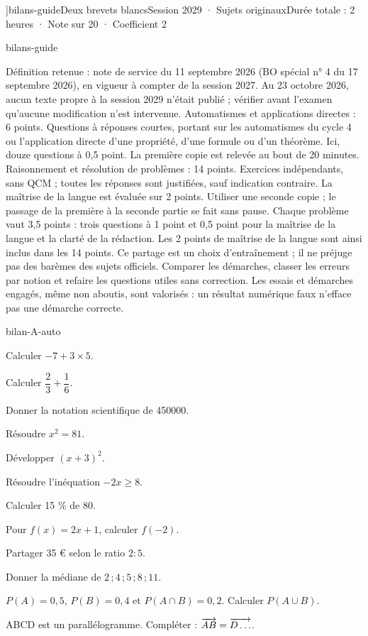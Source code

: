 \editionPage[\pdfbookmark[0]{Deux brevets blancs}{bm-bilans-guide-parent}]{bilans-guide}{Deux brevets blancs}{Session 2029 · Sujets originaux}{Durée totale : 2 heures · Note sur 20 · Coefficient 2}
\begin{blocEdition}{bilans-guide}

Définition retenue : note de service du 11 septembre 2026 (BO spécial n° 4 du
17 septembre 2026), en vigueur à compter de la session 2027. Au 23 octobre 2026,
aucun texte propre à la session 2029 n’était publié ; vérifier avant l’examen
qu’aucune modification n’est intervenue.
Automatismes et applications directes : 6 points. Questions à réponses courtes,
portant sur les automatismes du cycle 4 ou l’application directe d’une propriété,
d’une formule ou d’un théorème. Ici, douze questions à 0,5 point. La première
copie est relevée au bout de 20 minutes.
Raisonnement et résolution de problèmes : 14 points. Exercices indépendants,
sans QCM ; toutes les réponses sont justifiées, sauf indication contraire. La
maîtrise de la langue est évaluée sur 2 points. Utiliser une seconde copie ;
le passage de la première à la seconde partie se fait sans pause.
Chaque problème vaut 3,5 points : trois questions à 1 point et 0,5 point pour
la maîtrise de la langue et la clarté de la rédaction. Les 2 points de maîtrise
de la langue sont ainsi inclus dans les 14 points. Ce partage est un choix
d’entraînement ; il ne préjuge pas des barèmes des sujets officiels.
Comparer les démarches, classer les erreurs par notion et refaire les questions
utiles sans correction. Les essais et démarches engagés, même non aboutis, sont
valorisés : un résultat numérique faux n’efface pas une démarche correcte.

\end{blocEdition}
\begin{blocEdition}{bilan-A-auto}
\begin{questions}
\item Calculer $-7+3\times5$.
\item Calculer $\dfrac23+\dfrac16$.
\item Donner la notation scientifique de 450000.
\item Résoudre $x^2=81$.
\item Développer $(x+3)^2$.
\item Résoudre l’inéquation $-2x\ge8$.
\item Calculer 15 \% de 80.
\item Pour $f(x)=2x+1$, calculer $f(-2)$.
\item Partager 35 € selon le ratio $2:5$.
\item Donner la médiane de $2\,;4\,;5\,;8\,;11$.
\item $P(A)=0{,}5$, $P(B)=0{,}4$ et $P(A\cap B)=0{,}2$. Calculer $P(A\cup B)$.
\item ABCD est un parallélogramme. Compléter : $\overrightarrow{AB}=\overrightarrow{D\ldots}$.\end{questions}
\end{blocEdition}
